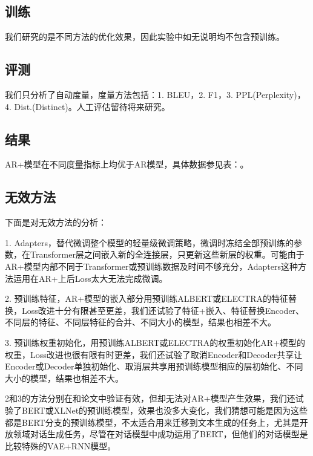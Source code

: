 \documentclass[letterpaper]{article} %
\DeclareRobustCommand{\citeext}[1]{\cite[#1]{#1}}
\begin{document}
\begin{CJK*}{UTF8}{gbsn}
\subsection[Training]{训练}
我们研究的是不同方法的优化效果，因此实验中如无说明均不包含预训练。

\subsection[Evaluation]{评测} 
我们只分析了自动度量，度量方法包括：1. BLEU\citeext{Papineni2002}，2. F1，3. PPL(Perplexity)，4. Dist.(Distinct)\citeext{Li2016}。人工评估留待将来研究。

\subsection[Result]{结果} 
AR+模型在不同度量指标上均优于AR模型，具体数据参见表：。


\subsection[Ineffective Methods]{无效方法} 
下面是对无效方法的分析：

1. Adapters\citeext{Houlsby2019}，替代微调整个模型的轻量级微调策略，微调时冻结全部预训练的参数，在Transformer层之间嵌入新的全连接层，只更新这些新层的权重。可能由于AR+模型内部不同于Transformer或预训练数据及时间不够充分，Adapters这种方法运用在AR+上后Loss太大无法完成微调。

2. 预训练特征\citeext{Devlin2019}，AR+模型的嵌入部分用预训练ALBERT\citeext{Lan2019}或ELECTRA\citeext{Clark2020}的特征替换，Loss改进十分有限甚至更差，我们还试验了特征+嵌入、特征替换Encoder、不同层的特征、不同层特征的合并、不同大小的模型，结果也相差不大。

3. 预训练权重初始化\citeext{Ziegler2019}，用预训练ALBERT或ELECTRA的权重初始化AR+模型的权重，Loss改进也很有限有时更差，我们还试验了取消Encoder和Decoder共享让Encoder或Decoder单独初始化、取消层共享用预训练模型相应的层初始化、不同大小的模型，结果也相差不大。

2和3的方法分别在\citeext{Devlin2019}和\citeext{Zhao2019}论文中验证有效，但却无法对AR+模型产生效果，我们还试验了BERT或XLNet\citeext{Yang2019}的预训练模型，效果也没多大变化，我们猜想可能是因为这些都是BERT分支的预训练模型，不太适合用来迁移到文本生成的任务上，尤其是开放领域对话生成任务，尽管\citeext{Zhao2019}在对话模型中成功运用了BERT，但他们的对话模型是比较特殊的VAE+RNN模型。


\end{CJK*}
\end{document}
